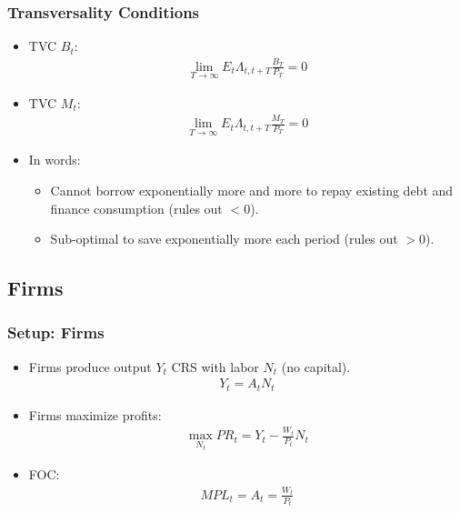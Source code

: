 \documentclass[english,xcolor=svgnames]{beamer}
\begin{document}
\begin{frame}
\frametitle{Transversality Conditions
}
\begin{itemize}
	\item TVC $B_t$:
	\begin{align*}
		\lim_{T\rightarrow\infty} E_t\Lambda_{t,t+T}\frac{B_T}{P_T} = 0
	\end{align*}
	\item TVC $M_t$:
	\begin{align*}
		\lim_{T\rightarrow\infty} E_t\Lambda_{t,t+T}\frac{M_T}{P_T} = 0
	\end{align*}
	\item In words:
	\begin{itemize}
		\item Cannot borrow exponentially more and more to repay existing debt and finance consumption (rules out $<0$).
		\item Sub-optimal to save exponentially more each period (rules out $>0$).
	\end{itemize}
\end{itemize}	
\end{frame}


\subsection{Firms}

\begin{frame}
\frametitle{Setup: Firms}
\begin{itemize}
	\item Firms produce output $Y_t$ CRS with labor $N_t$ (no capital).
	 \begin{align*}
			Y_t = A_t N_{t} 
		\end{align*}
	\item Firms maximize profits:
	\begin{align*}
		\max_{N_t}PR_t = Y_t - \frac{W_t}{P_t}N_t 
	\end{align*}
	\item FOC:
	\begin{align*}
		 MPL_t =   A_t   = \frac{W_t}{P_t}
	\end{align*}
\end{itemize}
\end{frame}
\end{document}
